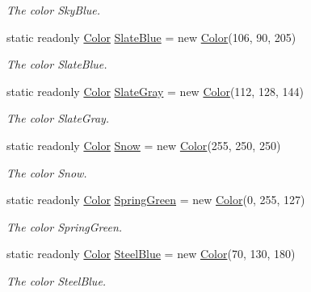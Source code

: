 \begin{DoxyCompactItemize}
\begin{DoxyCompactList}\small\item\em The color Sky\-Blue. \end{DoxyCompactList}\item 
static readonly \hyperlink{struct_tri_devs_1_1_tri_engine2_d_1_1_color}{Color} \hyperlink{struct_tri_devs_1_1_tri_engine2_d_1_1_color_a014c51e43b07b4a32af7a2fd0e4abc4e}{Slate\-Blue} = new \hyperlink{struct_tri_devs_1_1_tri_engine2_d_1_1_color}{Color}(106, 90, 205)
\begin{DoxyCompactList}\small\item\em The color Slate\-Blue. \end{DoxyCompactList}\item 
static readonly \hyperlink{struct_tri_devs_1_1_tri_engine2_d_1_1_color}{Color} \hyperlink{struct_tri_devs_1_1_tri_engine2_d_1_1_color_ad4fa05b55f8964cd46275ad16aa431d0}{Slate\-Gray} = new \hyperlink{struct_tri_devs_1_1_tri_engine2_d_1_1_color}{Color}(112, 128, 144)
\begin{DoxyCompactList}\small\item\em The color Slate\-Gray. \end{DoxyCompactList}\item 
static readonly \hyperlink{struct_tri_devs_1_1_tri_engine2_d_1_1_color}{Color} \hyperlink{struct_tri_devs_1_1_tri_engine2_d_1_1_color_aacf9b7d1f37da2a12e227af39c8ab117}{Snow} = new \hyperlink{struct_tri_devs_1_1_tri_engine2_d_1_1_color}{Color}(255, 250, 250)
\begin{DoxyCompactList}\small\item\em The color Snow. \end{DoxyCompactList}\item 
static readonly \hyperlink{struct_tri_devs_1_1_tri_engine2_d_1_1_color}{Color} \hyperlink{struct_tri_devs_1_1_tri_engine2_d_1_1_color_a9350253dc25b130a1b5b38f59bd1d9f8}{Spring\-Green} = new \hyperlink{struct_tri_devs_1_1_tri_engine2_d_1_1_color}{Color}(0, 255, 127)
\begin{DoxyCompactList}\small\item\em The color Spring\-Green. \end{DoxyCompactList}\item 
static readonly \hyperlink{struct_tri_devs_1_1_tri_engine2_d_1_1_color}{Color} \hyperlink{struct_tri_devs_1_1_tri_engine2_d_1_1_color_a6b775c157df3ce5c19890da5ed6921e4}{Steel\-Blue} = new \hyperlink{struct_tri_devs_1_1_tri_engine2_d_1_1_color}{Color}(70, 130, 180)
\begin{DoxyCompactList}\small\item\em The color Steel\-Blue. \end{DoxyCompactList}\item 

\end{DoxyCompactItemize}
